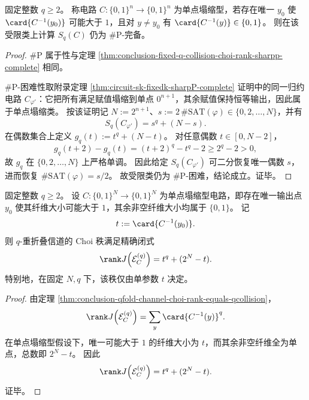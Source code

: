 \begin{theorem}\label{thm:conclusion-single-collapse-collision-sharpp-complete}
固定整数 \(q\ge 2\)。
称电路 \(C:\{0,1\}^n\to\{0,1\}^n\) 为单点塌缩型，若存在唯一 \(y_0\) 使 \(\card{C^{-1}(y_0)}\) 可能大于 \(1\)，且对 \(y\neq y_0\) 有 \(\card{C^{-1}(y)}\in\{0,1\}\)。
则在该受限类上计算 \(S_q(C)\) 仍为 \(\#\mathrm P\)-完备。
\end{theorem}
\begin{proof}
\(\#\mathrm P\) 属于性与定理 \ref{thm:conclusion-fixed-q-collision-choi-rank-sharpp-complete} 相同。

\(\#\mathrm P\)-困难性取附录定理 \ref{thm:circuit-sk-fixedk-sharpP-complete} 证明中的同一归约电路 \(C_{\varphi'}\)：它把所有满足赋值塌缩到单点 \(0^{n+1}\)，其余赋值保持恒等输出，因此属于单点塌缩类。
按该证明记 \(N:=2^{n+1}\)、\(s:=2\,\#\mathrm{SAT}(\varphi)\in\{0,2,\dots,N\}\)，并有
\[
S_q(C_{\varphi'})=s^q+(N-s).
\]
在偶数集合上定义 \(g_q(t):=t^q+(N-t)\)。
对任意偶数 \(t\in[0,N-2]\)，
\[
g_q(t+2)-g_q(t)=(t+2)^q-t^q-2\ge 2^q-2>0,
\]
故 \(g_q\) 在 \(\{0,2,\dots,N\}\) 上严格单调。
因此给定 \(S_q(C_{\varphi'})\) 可二分恢复唯一偶数 \(s\)，进而恢复 \(\#\mathrm{SAT}(\varphi)=s/2\)。
故受限类仍为 \(\#\mathrm P\)-困难，结论成立。证毕。
\end{proof}

\begin{theorem}\label{thm:conclusion-single-collapse-choi-rank-one-parameterization}
固定整数 \(q\ge 2\)。
设 \(C:\{0,1\}^N\to\{0,1\}^N\) 为单点塌缩型电路，即存在唯一输出点 \(y_0\) 使其纤维大小可能大于 \(1\)，其余非空纤维大小均属于 \(\{0,1\}\)。
记
\[
t:=\card{C^{-1}(y_0)}.
\]
则 \(q\)-重折叠信道的 Choi 秩满足精确闭式
\[
\rank J\!\left(\mathcal E_C^{(q)}\right)=t^q+(2^N-t).
\]
特别地，在固定 \(N,q\) 下，该秩仅由单参数 \(t\) 决定。
\end{theorem}
\begin{proof}
由定理 \ref{thm:conclusion-qfold-channel-choi-rank-equals-qcollision}，
\[
\rank J\!\left(\mathcal E_C^{(q)}\right)=\sum_{y}\card{C^{-1}(y)}^q.
\]
在单点塌缩型假设下，唯一可能大于 \(1\) 的纤维大小为 \(t\)，而其余非空纤维全为单点，总数即 \(2^N-t\)。
因此
\[
\rank J\!\left(\mathcal E_C^{(q)}\right)=t^q+(2^N-t).
\]
证毕。
\end{proof}

